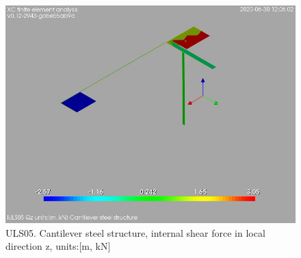 \begin{figure}
\begin{center}
\includegraphics[width=\linewidth]{ramp_wall/resLC/text/graphics/resSimplLC/lULS05steelMembersQz}
\caption{ULS05. Cantilever steel structure, internal shear force in local direction z, units:[m, kN]}
\end{center}
\end{figure}
\clearpage
